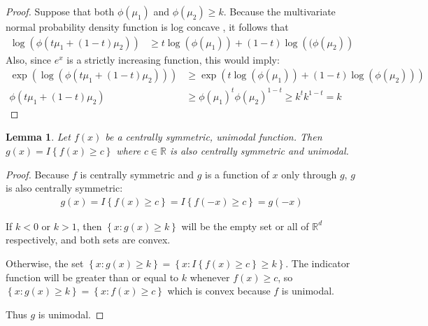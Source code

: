 \documentclass{article}
\newtheorem{lemma}[theorem]{Lemma}
\begin{document}
\begin{proof}
	Suppose that both $\phi(\mu_1)$ and $\phi(\mu_2) \geq k$.  Because the multivariate normal probability density function is log concave \citep{tong_multivariate_2012}, it follows that 
\begin{align*}
	\log\left(\phi(t \mu_1 + (1 - t) \mu_2)\right) & \geq t\log\left(\phi(\mu_1)\right) + (1 - t) \log\left((\phi(\mu_2)\right)
\end{align*}
Also, since $e^x$ is a strictly increasing function, this would imply:
\begin{align*}
	\exp\left(\log\left(\phi(t \mu_1 + (1 - t) \mu_2)\right)\right) & \geq \exp \left(t\log\left(\phi(\mu_1)\right) + (1 - t) \log\left(\phi(\mu_2)\right) \right)\\
	\phi(t \mu_1 + (1 - t) \mu_2) &\geq \phi(\mu_1)^{t} \phi(\mu_2)^{1-t}\geq k^{t}k^{1 - t} = k
\end{align*}
\end{proof}


\begin{lemma}
	\label{lemma:indct_cent_sym_unm}
	Let $f(x)$ be a centrally symmetric, unimodal function.  Then $g(x) = I\left\{f(x) \geq c\right\}$ where $c \in \mathbb{R}$ is also centrally symmetric and unimodal. 
\end{lemma}
\begin{proof}
Because $f$ is centrally symmetric and $g$ is a function of $x$ only through $g$, $g$ is also centrally symmetric:
	\begin{align*}
	g(x) = I\left\{f(x) \geq c\right\} = I\left\{f(-x) \geq c\right\} = g(-x)
	\end{align*}

	If $k < 0$ or $k > 1$, then $\left\{x : g(x) \geq k\right\}$ will be the empty set or all of $\mathbb{R}^d$ respectively, and both sets are convex.  
	
	Otherwise, the set $\left\{x : g(x) \geq k\right\} = \left\{x : I\left\{f(x) \geq c\right\} \geq k\right\}$. The indicator function will be greater than or equal to $k$ whenever $f(x) \geq c$, so $\left\{x : g(x) \geq k\right\} =\left\{x : f(x) \geq c\right\}$
	which is convex because $f$ is unimodal.

	Thus $g$ is unimodal.
\end{proof}
\end{document}
